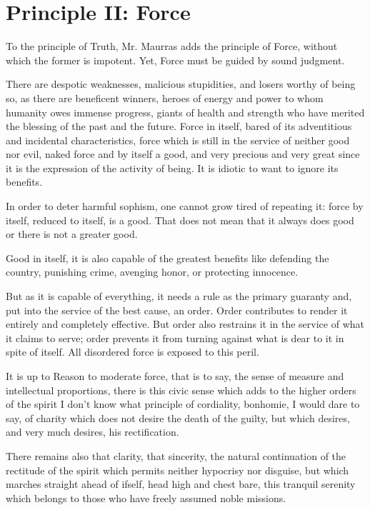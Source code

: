 \section{Principle II: Force}

To the principle of Truth, Mr. Maurras adds the principle of Force, without which the former is impotent. Yet, Force must be guided by sound judgment. 

There are despotic weaknesses, malicious stupidities, and losers worthy of being so, as there are beneficent winners, heroes of energy and power to whom humanity owes immense progress, giants of health and strength who have merited the blessing of the past and the future. Force in itself, bared of its adventitious and incidental characteristics, force which is still in the service of neither good nor evil, naked force and by itself a good, and very precious and very great since it is the expression of the activity of being. It is idiotic to want to ignore its benefits.

In order to deter harmful sophism, one cannot grow tired of repeating it: force by itself, reduced to itself, is a good. That does not mean that it always does good or there is not a greater good.

Good in itself, it is also capable of the greatest benefits like defending the country, punishing crime, avenging honor, or protecting innocence.

But as it is capable of everything, it needs a rule as the primary guaranty and, put into the service of the best cause, an order. Order contributes to render it entirely and completely effective. But order also restrains it in the service of what it claims to serve; order prevents it from turning against what is dear to it in spite of itself. All disordered force is exposed to this peril.

It is up to Reason to moderate force, that is to say, the sense of measure and intellectual proportions, there is this civic sense which adds to the higher orders of the spirit I don't know what principle of cordiality, bonhomie, I would dare to say, of charity which does not desire the death of the guilty, but which desires, and very much desires, his rectification.

There remains also that clarity, that sincerity, the natural continuation of the rectitude of the spirit which permits neither hypocrisy nor disguise, but which marches straight ahead of ifself, head high and chest bare, this tranquil serenity which belongs to those who have freely assumed noble missions.

